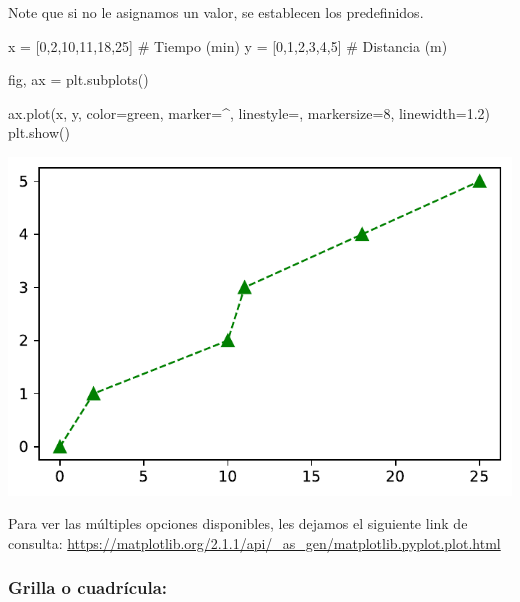 \documentclass[
  letterpaper,
  DIV=11,
  numbers=noendperiod]{scrreprt}
\newenvironment{Shaded}{\begin{snugshade}}{\end{snugshade}}
\newcommand{\CommentTok}[1]{\textcolor[rgb]{0.37,0.37,0.37}{#1}}
\newcommand{\DecValTok}[1]{\textcolor[rgb]{0.68,0.00,0.00}{#1}}
\newcommand{\FloatTok}[1]{\textcolor[rgb]{0.68,0.00,0.00}{#1}}
\newcommand{\NormalTok}[1]{\textcolor[rgb]{0.00,0.23,0.31}{#1}}
\newcommand{\OperatorTok}[1]{\textcolor[rgb]{0.37,0.37,0.37}{#1}}
\newcommand{\StringTok}[1]{\textcolor[rgb]{0.13,0.47,0.30}{#1}}
\begin{document}
Note que si no le asignamos un valor, se establecen los predefinidos.

\begin{Shaded}
\begin{Highlighting}[]
\NormalTok{x }\OperatorTok{=}\NormalTok{ [}\DecValTok{0}\NormalTok{,}\DecValTok{2}\NormalTok{,}\DecValTok{10}\NormalTok{,}\DecValTok{11}\NormalTok{,}\DecValTok{18}\NormalTok{,}\DecValTok{25}\NormalTok{]   }\CommentTok{\# Tiempo (min)}
\NormalTok{y }\OperatorTok{=}\NormalTok{ [}\DecValTok{0}\NormalTok{,}\DecValTok{1}\NormalTok{,}\DecValTok{2}\NormalTok{,}\DecValTok{3}\NormalTok{,}\DecValTok{4}\NormalTok{,}\DecValTok{5}\NormalTok{]       }\CommentTok{\# Distancia (m)}

\NormalTok{fig, ax }\OperatorTok{=}\NormalTok{ plt.subplots()}

\NormalTok{ax.plot(x, y, color}\OperatorTok{=}\StringTok{\textquotesingle{}green\textquotesingle{}}\NormalTok{, marker}\OperatorTok{=}\StringTok{\textquotesingle{}\^{}\textquotesingle{}}\NormalTok{, linestyle}\OperatorTok{=}\StringTok{\textquotesingle{}{-}{-}\textquotesingle{}}\NormalTok{, markersize}\OperatorTok{=}\DecValTok{8}\NormalTok{, linewidth}\OperatorTok{=}\FloatTok{1.2}\NormalTok{)}
\NormalTok{plt.show()}
\end{Highlighting}
\end{Shaded}

\includegraphics{unidad_6_files/figure-pdf/cell-111-output-1.pdf}

Para ver las múltiples opciones disponibles, les dejamos el siguiente
link de consulta:
\url{https://matplotlib.org/2.1.1/api/_as_gen/matplotlib.pyplot.plot.html}

\subsubsection{Grilla o cuadrícula:}\label{grilla-o-cuadruxedcula}
\end{document}
